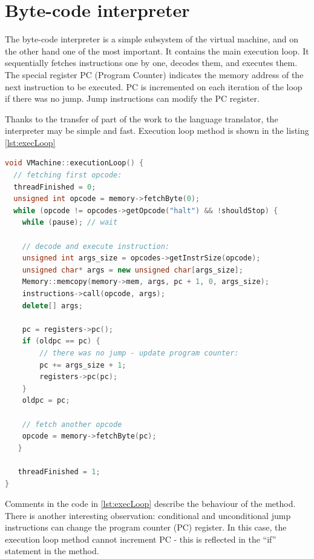 \documentclass[oneside]{book}
\begin{document}
\section{Byte-code interpreter}

The byte-code interpreter is a simple subsystem of the virtual machine, and on the other hand one of the most important. It contains the main execution loop. It sequentially fetches instructions one by one, decodes them, and executes them. The special register PC (Program Counter) indicates the memory address of the next instruction to be executed. PC is incremented on each iteration of the loop if there was no jump. Jump instructions can modify the PC register.

Thanks to the transfer of part of the work to the language translator, the interpreter may be simple and fast. Execution loop method is shown in the listing \ref{lst:execLoop}

\begin{lstlisting}[caption=Execution loop, label={lst:execLoop}, language=C++, style=customc]
void VMachine::executionLoop() {
  // fetching first opcode:
  threadFinished = 0;
  unsigned int opcode = memory->fetchByte(0);
  while (opcode != opcodes->getOpcode("halt") && !shouldStop) {
    while (pause); // wait

    // decode and execute instruction:
    unsigned int args_size = opcodes->getInstrSize(opcode);
    unsigned char* args = new unsigned char[args_size];
    Memory::memcopy(memory->mem, args, pc + 1, 0, args_size);
    instructions->call(opcode, args);
    delete[] args;

    pc = registers->pc();
    if (oldpc == pc) {
        // there was no jump - update program counter:
        pc += args_size + 1;
        registers->pc(pc);
    }
    oldpc = pc;

    // fetch another opcode
    opcode = memory->fetchByte(pc);
   }

   threadFinished = 1;
}

\end{lstlisting}

Comments in the code in \ref{lst:execLoop} describe the behaviour of the method. There is another interesting observation: conditional and unconditional jump instructions can change the program counter (PC) register. In this case, the execution loop method cannot increment PC - this is reflected in the ``if'' statement in the method.
\end{document}
